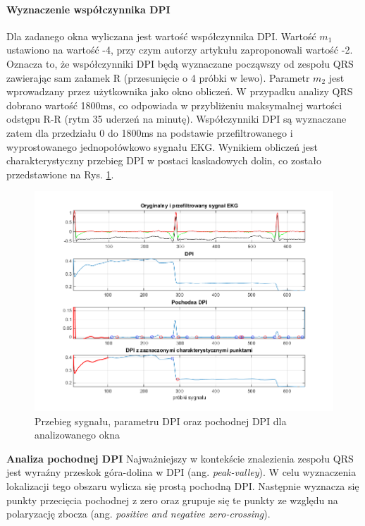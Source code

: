 \documentclass[a4paper,10pt]{article} %
\begin{document}
\paragraph{Wyznaczenie współczynnika DPI}
Dla zadanego okna wyliczana jest wartość współczynnika DPI. Wartość $m_1$ ustawiono na wartość -4, przy czym autorzy artykułu \cite{dpi_qrs} zaproponowali wartość -2. Oznacza to, że współczynniki DPI będą wyznaczane począwszy od zespołu QRS zawierając sam załamek R (przesunięcie o 4 próbki w lewo). Parametr $m_2$ jest wprowadzany przez użytkownika jako okno obliczeń. W przypadku analizy QRS dobrano wartość 1800ms, co odpowiada w przybliżeniu maksymalnej wartości odstępu R-R (rytm 35 uderzeń na minutę). Współczynniki DPI są wyznaczane zatem dla przedziału 0 do 1800ms na podstawie przefiltrowanego i wyprostowanego jednopołówkowo sygnału EKG. Wynikiem obliczeń jest charakterystyczny przebieg DPI w postaci kaskadowych dolin, co zostało przedstawione na Rys. \ref{dpi_plot}. 
\begin{figure}[h]
    \centering
    \includegraphics[width=1\textwidth]{img/DPI_single.png}
    \caption{Przebieg sygnału, parametru DPI oraz pochodnej DPI dla analizowanego okna}
    \label{dpi_plot}
\end{figure}
\newline
\textbf{Analiza pochodnej DPI}
\newline
Najważniejszy w kontekście znalezienia zespołu QRS jest wyraźny przeskok góra-dolina w DPI (ang. \textit{peak-valley}). W celu wyznaczenia lokalizacji tego obszaru wylicza się prostą pochodną DPI. Następnie wyznacza się punkty przecięcia pochodnej z zero oraz grupuje się te punkty ze względu na polaryzację zbocza (ang. \textit{positive and negative zero-crossing}). 
\end{document}
